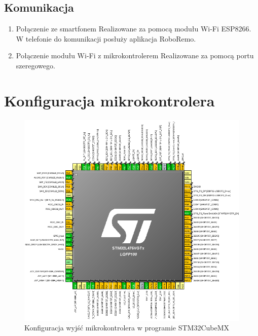 \documentclass[10pt, a4paper]{article}
\begin{document}
	\subsection{Komunikacja}
	\begin{enumerate}
		\item Połączenie ze smartfonem
		\newline
		Realizowane za pomocą modułu Wi-Fi ESP8266. W telefonie do komunikacji posłuży aplikacja RoboRemo.
		\item Połączenie modułu Wi-Fi z mikrokontrolerem
		\newline
		Realizowane za pomocą portu szeregowego.
	\end{enumerate}
	
\section{Konfiguracja mikrokontrolera}
\begin{figure}[H]
	\centering
	\includegraphics[width=1\textwidth]{figures/piny1.png}
	\caption{Konfiguracja wyjść mikrokontrolera w programie STM32CubeMX}
	\label{fig:KonfiguracjaMikrokontrolera}
\end{figure}
\end{document}
